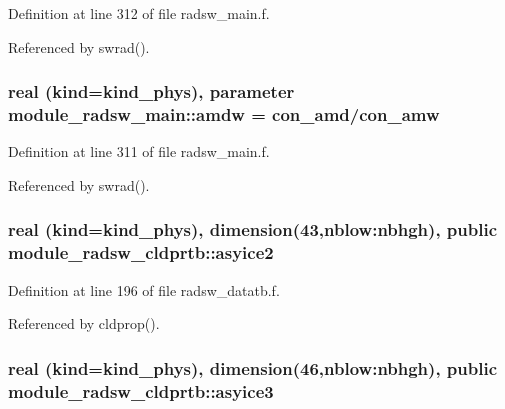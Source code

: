 Definition at line 312 of file radsw\+\_\+main.\+f.



Referenced by swrad().

\subsubsection[{\texorpdfstring{amdw}{amdw}}]{\setlength{\rightskip}{0pt plus 5cm}real (kind=kind\+\_\+phys), parameter module\+\_\+radsw\+\_\+main\+::amdw = con\+\_\+amd/con\+\_\+amw\hspace{0.3cm}{\ttfamily [private]}}\hypertarget{group__module__radsw__main_ga1445a63250d89083447371120c484618}{}\label{group__module__radsw__main_ga1445a63250d89083447371120c484618}


Definition at line 311 of file radsw\+\_\+main.\+f.



Referenced by swrad().

\subsubsection[{\texorpdfstring{asyice2}{asyice2}}]{\setlength{\rightskip}{0pt plus 5cm}real (kind=kind\+\_\+phys), dimension(43,nblow\+:nbhgh), public module\+\_\+radsw\+\_\+cldprtb\+::asyice2}\hypertarget{group__module__radsw__main_gad9328ffc5e90cc62c8c9c5089b55fc79}{}\label{group__module__radsw__main_gad9328ffc5e90cc62c8c9c5089b55fc79}


Definition at line 196 of file radsw\+\_\+datatb.\+f.



Referenced by cldprop().

\subsubsection[{\texorpdfstring{asyice3}{asyice3}}]{\setlength{\rightskip}{0pt plus 5cm}real (kind=kind\+\_\+phys), dimension(46,nblow\+:nbhgh), public module\+\_\+radsw\+\_\+cldprtb\+::asyice3}\hypertarget{group__module__radsw__main_gaec2685be0de3a557aca169062cf1055e}{}\label{group__module__radsw__main_gaec2685be0de3a557aca169062cf1055e}


